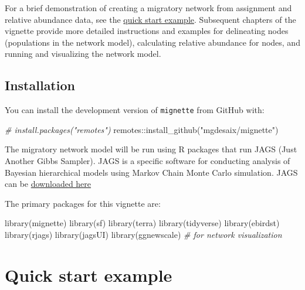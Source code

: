 \documentclass[
]{book}
\newenvironment{Shaded}{\begin{snugshade}}{\end{snugshade}}
\newcommand{\CommentTok}[1]{\textcolor[rgb]{0.56,0.35,0.01}{\textit{#1}}}
\newcommand{\FunctionTok}[1]{\textcolor[rgb]{0.00,0.00,0.00}{#1}}
\newcommand{\NormalTok}[1]{#1}
\newcommand{\SpecialCharTok}[1]{\textcolor[rgb]{0.00,0.00,0.00}{#1}}
\newcommand{\StringTok}[1]{\textcolor[rgb]{0.31,0.60,0.02}{#1}}
\begin{document}
For a brief demonstration of creating a migratory network from assignment and relative abundance data, see the \protect\hyperlink{quickstart}{quick start example}. Subsequent chapters of the vignette provide more detailed instructions and examples for delineating nodes (populations in the network model), calculating relative abundance for nodes, and running and visualizing the network model.

\hypertarget{installation}{%
\section{Installation}\label{installation}}

You can install the development version of \texttt{mignette} from GitHub with:

\begin{Shaded}
\begin{Highlighting}[]
\CommentTok{\# install.packages("remotes")}
\NormalTok{remotes}\SpecialCharTok{::}\FunctionTok{install\_github}\NormalTok{(}\StringTok{"mgdesaix/mignette"}\NormalTok{)}
\end{Highlighting}
\end{Shaded}

The migratory network model will be run using R packages that run JAGS (Just Another Gibbs Sampler). JAGS is a specific software for conducting analysis of Bayesian hierarchical models using Markov Chain Monte Carlo simulation. JAGS can be \href{https://mcmc-jags.sourceforge.io/}{downloaded here}

The primary packages for this vignette are:

\begin{Shaded}
\begin{Highlighting}[]
\FunctionTok{library}\NormalTok{(mignette)}
\FunctionTok{library}\NormalTok{(sf)}
\FunctionTok{library}\NormalTok{(terra)}
\FunctionTok{library}\NormalTok{(tidyverse)}
\FunctionTok{library}\NormalTok{(ebirdst)}
\FunctionTok{library}\NormalTok{(rjags)}
\FunctionTok{library}\NormalTok{(jagsUI)}
\FunctionTok{library}\NormalTok{(ggnewscale) }\CommentTok{\# for network visualization}
\end{Highlighting}
\end{Shaded}

\hypertarget{quickstart}{%
\chapter{Quick start example}\label{quickstart}}
\end{document}
